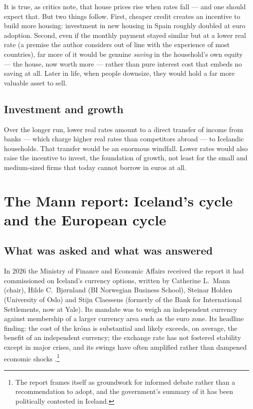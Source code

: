 \documentclass[11pt,a4paper]{article}
\begin{document}
It is true, as critics note, that house prices rise when rates fall --- and one
should expect that. But two things follow. First, cheaper credit creates an
incentive to build more housing: investment in new housing in Spain roughly
doubled at euro adoption. Second, even if the monthly payment stayed similar
but at a lower real rate (a premise the author considers out of line with the
experience of most countries), far more of it would be genuine \emph{saving}
in the household's own equity --- the house, now worth more --- rather than
pure interest cost that embeds no saving at all. Later in life, when people
downsize, they would hold a far more valuable asset to sell.

\subsection{Investment and growth}
Over the longer run, lower real rates amount to a direct transfer of income from
banks --- which charge higher real rates than competitors abroad --- to
Icelandic households. That transfer would be an enormous windfall. Lower rates
would also raise the incentive to invest, the foundation of growth, not least
for the small and medium-sized firms that today cannot borrow in euros at all.

\section{The Mann report: Iceland's cycle and the European cycle}

\subsection{What was asked and what was answered}
In 2026 the Ministry of Finance and Economic Affairs received the report it
had commissioned on Iceland's currency options, written by Catherine L.~Mann
(chair), Hilde C.~Bj{\o}rnland (BI Norwegian Business School), Steinar Holden
(University of Oslo) and Stijn Claessens (formerly of the Bank for
International Settlements, now at Yale). Its mandate was to weigh an
independent currency against membership of a larger currency area such as the
euro zone. Its headline finding: the cost of the kr\'ona is substantial and
likely exceeds, on average, the benefit of an independent currency; the
exchange rate has not fostered stability except in major crises, and its
swings have often amplified rather than dampened economic shocks
\citep{mann2026}.\footnote{The report frames itself as groundwork for informed
debate rather than a recommendation to adopt, and the government's summary of
it has been politically contested in Iceland.}
\end{document}
